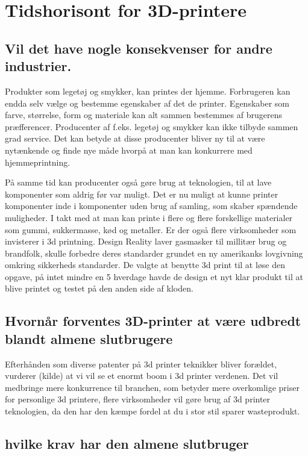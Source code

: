 
\chapter{Tidshorisont for 3D-printere}
\section{Vil det have nogle konsekvenser for andre industrier.}


Produkter som legetøj og smykker, kan printes der hjemme. Forbrugeren kan endda selv vælge og bestemme egenskaber af det de printer. Egenskaber som farve, størrelse, form og materiale kan alt sammen bestemmes af brugerens præfferencer. Producenter af f.eks. legetøj og smykker kan ikke tilbyde sammen grad service. Det kan betyde at disse producenter bliver ny til at være nytænkende og finde nye måde hvorpå at man kan konkurrere med hjemmeprintning.

På samme tid kan producenter også gøre brug at teknologien, til at lave komponenter som aldrig før var muligt. Det er nu muligt at kunne printer komponenter inde i komponenter uden brug af samling, som skaber spændende muligheder.
I takt med at man kan printe i flere og flere forskellige materialer som gummi, sukkermasse, kød og metaller. Er der også flere virksomheder som invisterer i 3d printning.
Design Reality laver gasmasker til millitær brug og brandfolk, skulle forbedre deres standarder grundet en ny amerikanks lovgivning omkring sikkerheds standarder. De valgte at benytte 3d print til at løse den opgave, på intet mindre en 5 hverdage havde de design et nyt klar produkt til at blive printet og testet på den anden side af kloden.\cite{gasmasker}

\section{Hvornår forventes 3D-printer at være udbredt blandt almene slutbrugere}

Efterhånden som diverse patenter på 3d printer teknikker bliver forældet, vurderer (kilde) at vi vil se et enormt boom i 3d printer verdenen. Det vil medbringe mere konkurrence til branchen, som betyder mere overkomlige priser for personlige 3d printere, flere virksomheder vil gøre brug af 3d printer teknologien, da den har den kæmpe fordel at du i stor stil sparer wasteprodukt. 

\section{hvilke krav har den almene slutbruger}

